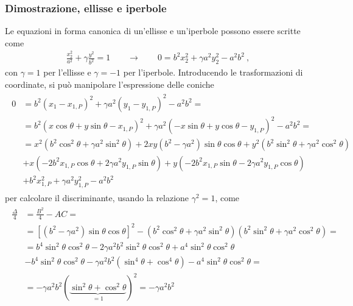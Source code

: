 \documentclass[letterpaper,10pt,italian]{jupyterBook}
\begin{document}
\subsubsection*{Dimostrazione, ellisse e iperbole}

\sphinxAtStartPar
Le equazioni in forma canonica di un’ellisse e un’iperbole possono essere scritte come
\begin{equation*}
\begin{split}\frac{x_2^2}{a^2} + \gamma \frac{y^2}{b^2} = 1 \qquad \rightarrow \qquad 0 = b^2 x_2^2 + \gamma a^2 y_2^2 - a^2 b^2 \ ,\end{split}
\end{equation*}
\sphinxAtStartPar
con \(\gamma = 1\) per l’ellisse e \(\gamma = -1\) per l’iperbole. Introducendo le trasformazioni di coordinate, si può manipolare l’espressione delle coniche
\begin{equation*}
\begin{split}\begin{aligned}
  0 
  & = b^2 ( x_1 - x_{1,P} )^2 + \gamma a^2 ( y_1 - y_{1,P} )^2 - a^2 b^2 = \\
  & = b^2 ( x \cos \theta + y \sin \theta - x_{1,P} )^2 + \gamma a^2 ( - x \sin \theta + y \cos \theta - y_{1,P} )^2 - a^2 b^2 = \\
  & = x^2   \left( b^2 \cos^2 \theta + \gamma a^2 \sin^2 \theta \right)
    + 2 x y \left( b^2 - \gamma a^2 \right) \sin \theta \cos \theta 
    + y^2   \left( b^2 \sin^2 \theta + \gamma a^2 \cos^2 \theta \right) \\
  & + x     \left( - 2 b^2 x_{1,P} \cos \theta + 2 \gamma a^2 y_{1,P} \sin \theta \right) 
    + y     \left( - 2 b^2 x_{1,P} \sin \theta - 2 \gamma a^2 y_{1,P} \cos \theta \right) \\
  & + b^2 x_{1,P}^2 + \gamma a^2 y_{1,P}^2 - a^2 b^2 
\end{aligned}\end{split}
\end{equation*}
\sphinxAtStartPar
per calcolare il discriminante, usando la relazione \(\gamma^2 = 1\), come
\begin{equation*}
\begin{split}\begin{aligned}
  \frac{\Delta}{4}
  & = \frac{B^2}{4} - AC = \\
  & = \left[ \left( b^2 - \gamma a^2 \right) \sin \theta \cos \theta \right]^2 - \left( b^2 \cos^2 \theta + \gamma a^2 \sin^2 \theta \right) \left( b^2 \sin^2 \theta + \gamma a^2 \cos^2 \theta \right) = \\
  & = b^4 \sin^2 \theta \cos^2 \theta - 2 \gamma a^2 b^2 \sin^2 \theta \cos^2 \theta + a^4 \sin^2 \theta \cos^2 \theta \\
  & - b^4 \sin^2 \theta \cos^2 \theta - \gamma a^2 b^2 \left( \sin^4 \theta + \cos^4 \theta \right) - a^4 \sin^2 \theta \cos^2 \theta = \\
  & = - \gamma a^2 b^2 \left(\underbrace{ \sin^2 \theta + \cos^2 \theta}_{=1} \right)^2 = - \gamma a^2 b^2
\end{aligned}\end{split}
\end{equation*}
\end{document}
